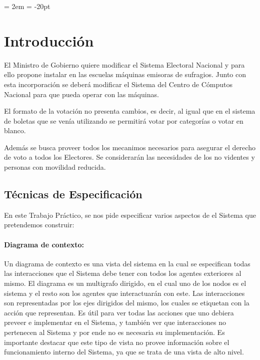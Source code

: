 \documentclass[spanish, 10pt,a4paper]{article}
\numberwithin{equation}{section} %
\begin{document}
{ \oddsidemargin = 2em
	\headheight = -20pt
	\maketitle
}
	
\section{Introducción}
	El Ministro de Gobierno quiere modificar el Sistema Electoral Nacional y para ello propone instalar en las escuelas máquinas emisoras de sufragios. Junto con esta incorporación se deberá modificar el Sistema del Centro de Cómputos Nacional para que pueda operar con las máquinas.

	El formato de la votación no presenta cambios, es decir, al igual que en el sistema de boletas que se venía utilizando se permitirá votar por categorías o votar en blanco. 
	
	Además se busca proveer todos los mecanimos necesarios para asegurar el derecho de voto a todos los Electores. Se considerarán las necesidades de los no videntes y personas con movilidad reducida.
	
\subsection{Técnicas de Especificación}

En este Trabajo Práctico, se nos pide especificar varios aspectos de el Sistema que pretendemos construir:
\vspace{-2em}
\paragraph{Diagrama de contexto:} Un diagrama de contexto es una vista del sistema en la cual se especifican todas las interacciones que el Sistema debe tener con todos los agentes exteriores al mismo. El diagrama es un multigrafo dirigido, en el cual uno de los nodos es el sistema y el resto son los agentes que interactuarán con este. Las interacciones son representadas por los ejes dirigidos del mismo, los cuales se etiquetan con la acción que representan. Es útil para ver todas las acciones que uno debiera preveer e implementar en el Sistema, y también ver que interacciones no pertenecen al Sistema y por ende no es necesaria su implementación. Es importante destacar que este tipo de vista no provee información sobre el funcionamiento interno del Sistema, ya que se trata de una vista de alto nivel.
\end{document}
